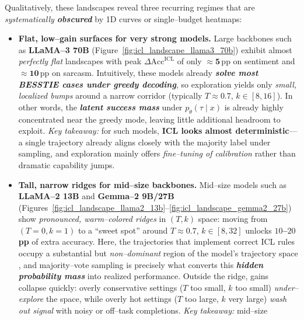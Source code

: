 Qualitatively, these landscapes reveal three recurring regimes that are
\emph{systematically \textbf{obscured}} by 1D curves or single--budget
heatmaps:

\begin{itemize}[leftmargin=1.5em]
  \item \textbf{Flat, low--gain surfaces for very strong models.}
        Large backbones such as \textbf{LLaMA--3 70B}
        (Figure~\ref{fig:icl_landscape_llama3_70b}) exhibit almost
        \emph{perfectly flat} landscapes with peak
        $\Delta \mathrm{Acc}^{\mathrm{ICL}}$ of only
        $\mathbf{\approx 5}$\,pp on sentiment and
        $\mathbf{\approx 10}$\,pp on sarcasm. Intuitively, these models
        already \emph{\textbf{solve most BESSTIE cases under greedy
        decoding}}, so exploration yields only \emph{small, localized
        bumps} around a narrow corridor (typically
        $T \approx 0.7$, $k \in [8,16]$). In other words, the
        \emph{\textbf{latent success mass}} under $p_\theta(\tau\mid x)$
        is already highly concentrated near the greedy mode, leaving
        little additional headroom to exploit. \emph{Key takeaway:}
        for such models, \textbf{ICL looks almost deterministic}---a
        single trajectory already aligns closely with the majority label
        under sampling, and exploration mainly offers \emph{fine--tuning
        of calibration} rather than dramatic capability jumps.
  \item \textbf{Tall, narrow ridges for mid--size backbones.}
        Mid--size models such as \textbf{LLaMA--2 13B} and
        \textbf{Gemma--2 9B/27B}
        (Figures~\ref{fig:icl_landscape_llama2_13b}--\ref{fig:icl_landscape_gemma2_27b})
        show \emph{pronounced, warm--colored ridges} in $(T,k)$ space:
        moving from $(T{=}0,k{=}1)$ to a ``sweet spot'' around
        $T \approx 0.7$, $k \in [8,32]$ unlocks
        \textbf{$10$--$20$\,pp} of extra accuracy. Here, the trajectories
        that implement correct ICL rules occupy a substantial but
        \emph{non--dominant} region of the model's trajectory space
        \citep{wei2022chainofthought}, and majority--vote sampling is
        precisely what converts this
        \emph{\textbf{hidden probability mass}} into realized
        performance. Outside the ridge, gains collapse quickly:
        overly conservative settings ($T$ too small, $k$ too small)
        \emph{under--explore} the space, while overly hot settings
        ($T$ too large, $k$ very large) \emph{wash out signal} with
        noisy or off--task completions. \emph{Key takeaway:} mid--size

\end{itemize}

